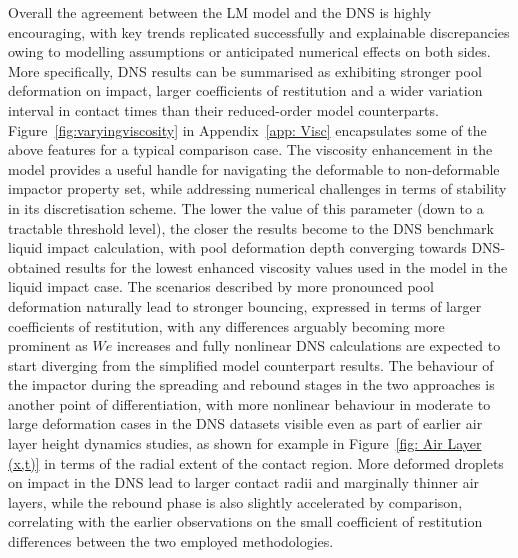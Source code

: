 Overall the agreement between the LM model and the DNS is highly encouraging, with key trends replicated successfully and explainable discrepancies owing to modelling assumptions or anticipated numerical effects on both sides. More specifically, DNS results can be summarised as exhibiting stronger pool deformation on impact, larger coefficients of restitution and a wider variation interval in contact times than their reduced-order model counterparts. Figure~\ref{fig:varyingviscosity} in Appendix~\ref{app: Visc} encapsulates some of the above features for a typical comparison case. The viscosity enhancement in the model provides a useful handle for navigating the deformable to non-deformable impactor property set, while addressing numerical challenges in terms of stability in its discretisation scheme. The lower the value of this parameter (down to a tractable threshold level), the closer the results become to the DNS benchmark liquid impact calculation, with pool deformation depth converging towards DNS-obtained results for the lowest enhanced viscosity values used in the model in the liquid impact case. The scenarios described by more pronounced pool deformation naturally lead to stronger bouncing, expressed in terms of larger coefficients of restitution, with any differences arguably becoming more prominent as $W\!e$ increases and fully nonlinear DNS calculations are expected to start diverging from the simplified model counterpart results. The behaviour of the impactor during the spreading and rebound stages in the two approaches is another point of differentiation, with more nonlinear behaviour in moderate to large deformation cases in the DNS datasets visible even as part of earlier air layer height dynamics studies, as shown for example in Figure~\ref{fig: Air Layer (x,t)} in terms of the radial extent of the contact region. More deformed droplets on impact in the DNS lead to larger contact radii and marginally thinner air layers, while the rebound phase is also slightly accelerated by comparison, correlating with the earlier observations on the small coefficient of restitution differences between the two employed methodologies.

